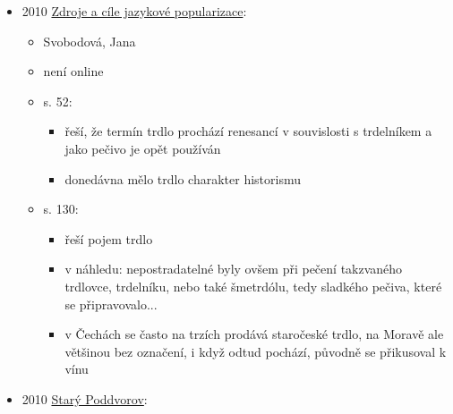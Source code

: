 \begin{itemize}
\begin{itemize}
    \begin{itemize}
    \tightlist
    \item
      cituje zase historku o Gvadánim, ale dává i zajímavý informace
    \item
      pekly se na svatbách, křtinách, jarmarcích, pašijových
      slavnostech, poutích, vánočních trzích a 24. dubna, na svátek sv.
      Jiří
    \item
      vyhlášeného pekaře trdelníků Martina Figury, který
    \end{itemize}
  \item
    s. 27: Spolu s dalšími dobrými a vydatnými pokrmy se trdelníky pekly
    šestinedělkám „do kouta``, což byla plachtou - koutnicí
  \end{itemize}
\item
  2010
  \href{https://ceskadigitalniknihovna.cz/uuid/uuid:467e18f0-1b9b-11e8-a0cf-005056827e52}{Zdroje
  a cíle jazykové popularizace}:

  \begin{itemize}
  \tightlist
  \item
    Svobodová, Jana
  \item
    není online
  \item
    s. 52:

    \begin{itemize}
    \tightlist
    \item
      řeší, že termín trdlo prochází renesancí v souvislosti s
      trdelníkem a jako pečivo je opět používán
    \item
      donedávna mělo trdlo charakter historismu
    \end{itemize}
  \item
    s. 130:

    \begin{itemize}
    \tightlist
    \item
      řeší pojem trdlo
    \item
      v náhledu: nepostradatelné byly ovšem při pečení takzvaného
      trdlovce, trdelníku, nebo také šmetrdólu, tedy sladkého pečiva,
      které se připravovalo...
    \item
      v Čechách se často na trzích prodává staročeské trdlo, na Moravě
      ale většinou bez označení, i když odtud pochází, původně se
      přikusoval k vínu
    \end{itemize}
  \end{itemize}
\item
  2010
  \href{https://ceskadigitalniknihovna.cz/uuid/uuid:de93a670-fd0d-11e7-b1a1-005056827e52}{Starý
  Poddvorov}:


\end{itemize}
